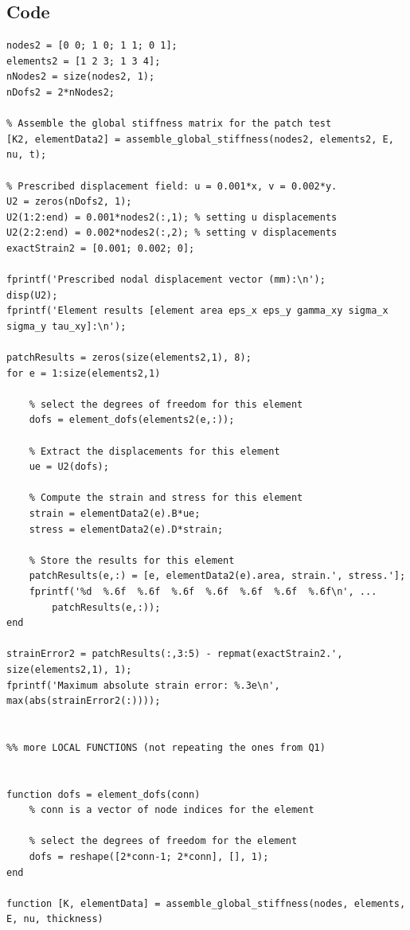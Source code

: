 \subsection{Code}
\begin{lstlisting}[style=matlabcode]
% setting up a 1x1 square patch with two triangular elements
nodes2 = [0 0; 1 0; 1 1; 0 1];
elements2 = [1 2 3; 1 3 4];
nNodes2 = size(nodes2, 1);
nDofs2 = 2*nNodes2;

% Assemble the global stiffness matrix for the patch test
[K2, elementData2] = assemble_global_stiffness(nodes2, elements2, E, nu, t);

% Prescribed displacement field: u = 0.001*x, v = 0.002*y.
U2 = zeros(nDofs2, 1);
U2(1:2:end) = 0.001*nodes2(:,1); % setting u displacements
U2(2:2:end) = 0.002*nodes2(:,2); % setting v displacements
exactStrain2 = [0.001; 0.002; 0];

fprintf('Prescribed nodal displacement vector (mm):\n');
disp(U2);
fprintf('Element results [element area eps_x eps_y gamma_xy sigma_x sigma_y tau_xy]:\n');

patchResults = zeros(size(elements2,1), 8);
for e = 1:size(elements2,1)

    % select the degrees of freedom for this element
    dofs = element_dofs(elements2(e,:));

    % Extract the displacements for this element
    ue = U2(dofs);

    % Compute the strain and stress for this element
    strain = elementData2(e).B*ue;
    stress = elementData2(e).D*strain;

    % Store the results for this element
    patchResults(e,:) = [e, elementData2(e).area, strain.', stress.'];
    fprintf('%d  %.6f  %.6f  %.6f  %.6f  %.6f  %.6f  %.6f\n', ...
        patchResults(e,:));
end

strainError2 = patchResults(:,3:5) - repmat(exactStrain2.', size(elements2,1), 1);
fprintf('Maximum absolute strain error: %.3e\n', max(abs(strainError2(:))));


%% more LOCAL FUNCTIONS (not repeating the ones from Q1)


function dofs = element_dofs(conn)
    % conn is a vector of node indices for the element
    
    % select the degrees of freedom for the element
    dofs = reshape([2*conn-1; 2*conn], [], 1);
end

function [K, elementData] = assemble_global_stiffness(nodes, elements, E, nu, thickness)
    

\end{lstlisting}
